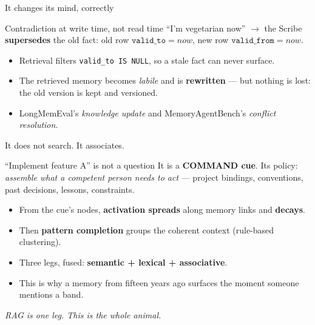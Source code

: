\documentclass[aspectratio=169,10pt]{beamer}
\begin{document}
\begin{frame}{It changes its mind, correctly}
  \begin{block}{Contradiction at write time, not read time}
    ``I'm vegetarian now'' $\rightarrow$ the Scribe \textbf{supersedes} the old fact: old row
    $\texttt{valid\_to} = now$, new row $\texttt{valid\_from} = now$.
  \end{block}
  \begin{itemize}
    \item Retrieval filters \texttt{valid\_to IS NULL}, so a stale fact can never surface.
    \item The retrieved memory becomes \emph{labile} and is \textbf{rewritten} --- but nothing is lost:
    the old version is kept and versioned.
    \item LongMemEval's \emph{knowledge update} and MemoryAgentBench's \emph{conflict resolution}.
  \end{itemize}
\end{frame}

\begin{frame}{It does not search. It associates.}
  \begin{block}{``Implement feature A'' is not a question}
    It is a \textbf{COMMAND cue}. Its policy: \emph{assemble what a competent person needs to act} ---
    project bindings, conventions, past decisions, lessons, constraints.
  \end{block}
  \begin{itemize}
    \item From the cue's nodes, \textbf{activation spreads} along memory links and \textbf{decays}.
    \item Then \textbf{pattern completion} groups the coherent context (rule-based clustering).
    \item Three legs, fused: \textbf{semantic + lexical + associative}.
    \item This is why a memory from fifteen years ago surfaces the moment someone mentions a band.
  \end{itemize}
  \vfill
  \centering\itshape RAG is one leg. This is the whole animal.
\end{frame}
\end{document}
